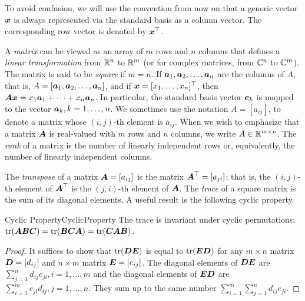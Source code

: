 \begin{xattention}
	To avoid confusion, we will use the convention from now on that a generic vector \(\boldsymbol{x}\) is always represented via the standard basis as a column vector. The corresponding row vector is denoted by \(\boldsymbol{x}^\top\).
\end{xattention}

A \textit{matrix} can be viewed as an array of \(m\) rows and \(n\) columns that defines a \textit{linear transformation} from \(\mathbb{R}^n\) to \(\mathbb{R}^m\) (or for complex matrices, from \(\mathbb{C}^n\) to \(\mathbb{C}^m\)). The matrix is said to be \textit{square} if \(m = n\). If \(\boldsymbol{a}_1, \boldsymbol{a}_2, \dots, \boldsymbol{a}_n\) are the columns of \(A\), that is, \(A = [\boldsymbol{a}_1, \boldsymbol{a}_2, \dots, \boldsymbol{a}_n]\), and if \(\boldsymbol{x} = [x_1, \dots, x_n]^\top\), then \(\boldsymbol{A}\boldsymbol{x} = x_1 \boldsymbol{a}_1 + \dots + x_n \boldsymbol{a}_n\). In particular, the standard basis vector \(\boldsymbol{e}_k\) is mapped to the vector \(\boldsymbol{a}_k, k = 1, \dots, n\). We sometimes use the notation \(A = [a_{ij}]\), to denote a matrix whose \((i, j)\)-th element is \(a_{ij}\). When we wish to emphasize that a matrix \(\boldsymbol{A}\) is real-valued with \(m\) rows and \(n\) columns, we write \(A \in \mathbb{R}^{m \times n}\). The \textit{rank} of a matrix is the number of linearly independent rows or, equivalently, the number of linearly independent columns.

The \textit{transpose} of a matrix \(\boldsymbol{A} = [a_{ij}]\) is the matrix \(\boldsymbol{A}^\top = [a_{ji}]\); that is, the \((i, j)\)-th element of \(\boldsymbol{A}^\top\) is the \((j, i)\)-th element of \(\boldsymbol{A}\). The \textit{trace} of a square matrix is the sum of its diagonal elements. A useful result is the following cyclic property.

\begin{thm}{Cyclic Property}{CyclicProperty}
	The trace is invariant under cyclic permutations: \(\mathrm{tr}(\boldsymbol{ABC}) = \mathrm{tr}(\boldsymbol{BCA}) = \mathrm{tr}(\boldsymbol{CAB})\).
\end{thm}

\begin{proof}
	It suffices to show that \(\mathrm{tr}(\boldsymbol{DE})\) is equal to \(\mathrm{tr}(\boldsymbol{ED})\) for any \(m \times n\) matrix \(\boldsymbol{D} = [d_{ij}]\) and \(n \times m\) matrix \(\boldsymbol{E} = [e_{ij}]\). The diagonal elements of \(\boldsymbol{DE}\) are \(\sum_{j=1}^n d_{ij} e_{ji}, i = 1, \dots, m\) and the diagonal elements of \(\boldsymbol{ED}\) are \(\sum_{i=1}^m e_{ji} d_{ij}, j = 1, \dots, n\). They sum up to the same number \(\sum_{i=1}^m \sum_{j=1}^n d_{ij} e_{ji}\).
\end{proof}

